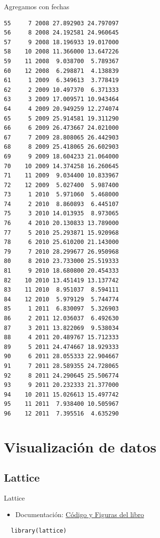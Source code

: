 \documentclass[xcolor={usenames,svgnames,dvipsnames}]{beamer}
\begin{document}
\begin{frame}[fragile,label=sec-5-3-4]{Agregamos con fechas}
\begin{verbatim}
55     7 2008 27.892903 24.797097
56     8 2008 24.192581 24.960645
57     9 2008 18.196933 19.017000
58    10 2008 11.366000 13.647226
59    11 2008  9.038700  5.789367
60    12 2008  6.298871  4.138839
61     1 2009  6.349613  3.778419
62     2 2009 10.497370  6.371333
63     3 2009 17.009571 10.943464
64     4 2009 20.949259 12.274074
65     5 2009 25.914581 19.311290
66     6 2009 26.473667 24.021000
67     7 2009 28.808065 26.442903
68     8 2009 25.418065 26.602903
69     9 2009 18.604233 21.064000
70    10 2009 14.374258 16.260645
71    11 2009  9.034400 10.833967
72    12 2009  5.027400  5.987400
73     1 2010  5.971060  5.468000
74     2 2010  8.860893  6.445107
75     3 2010 14.013935  8.973065
76     4 2010 20.130833 13.789000
77     5 2010 25.293871 15.920968
78     6 2010 25.610200 21.143000
79     7 2010 28.299677 26.950968
80     8 2010 23.733000 25.519333
81     9 2010 18.680800 20.454333
82    10 2010 13.451419 13.137742
83    11 2010  8.951037  8.594111
84    12 2010  5.979129  5.744774
85     1 2011  6.830097  5.326903
86     2 2011 12.036037  6.492630
87     3 2011 13.822069  9.538034
88     4 2011 20.489767 15.712333
89     5 2011 24.474667 18.929333
90     6 2011 28.055333 22.904667
91     7 2011 28.589355 24.728065
92     8 2011 24.290645 25.506774
93     9 2011 20.232333 21.377000
94    10 2011 15.026613 15.497742
95    11 2011  7.938400 10.505967
96    12 2011  7.395516  4.635290
\end{verbatim}
\end{frame}

\section{Visualización de datos}
\label{sec-6}
\subsection{Lattice}
\label{sec-6-1}

\begin{frame}[fragile,label=sec-6-1-1]{Lattice}
 \begin{itemize}
\item Documentación: \href{http://lmdvr.r-forge.r-project.org/figures/figures.html}{Código y Figuras del libro}
\end{itemize}

\lstset{language=R,label= ,caption= ,numbers=none}
\begin{lstlisting}
  library(lattice)
\end{lstlisting}
\end{frame}
\end{document}

